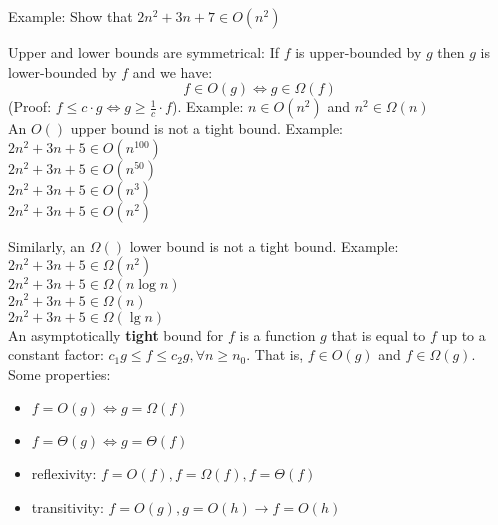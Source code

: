 \documentclass[11pt]{article}
\begin{document}
\vspace{\baselineskip}
Example: Show that $2n^2 +3n +7 \in O(n^2)$

\vspace{\baselineskip}
 Upper and lower bounds are symmetrical: If $f$ is upper-bounded by
$g$ then $g$ is lower-bounded by $f$ and we have:
$$f \in O(g) \Leftrightarrow g \in \Omega(f)$$
(Proof: $f \le c \cdot g \Leftrightarrow g \ge \frac{1}{c} \cdot f$). Example: 
$n \in O(n^2)$ and $n^2 \in \Omega(n)$\\


An $O()$ upper bound is not a tight bound.  Example: \\ 
$2n^2 + 3n +5 \in O(n^{100})$\\ 
$2n^2 +3n +5 \in O(n^{50})$\\ 
$2n^2 + 3n +5 \in O(n^3)$ \\ 
$2n^2 + 3n +5 \in O(n^2)$ 

Similarly, an $\Omega()$ lower bound is not a tight bound. Example: \\
$2n^2 + 3n +5 \in \Omega(n^2)$\\
$2n^2 + 3n +5 \in \Omega(n \log n)$ \\ 
$2n^2 + 3n +5 \in \Omega(n)$\\ 
$2n^2 + 3n +5 \in \Omega(\lg n)$\\



An asymptotically {\bf tight} bound for $f$ is a function $g$ that is
 equal to $f$ up to a constant factor: $c_1 g \le f \le c_2 g, \forall
 n \ge n_0$. That is, $f \in O(g)$ and $f \in \Omega(g)$.\\


Some properties: 
\begin{itemize}
\item $f = O(g) \Leftrightarrow g = \Omega(f)$
\item $f = \Theta(g) \Leftrightarrow g = \Theta(f)$
\item reflexivity: $f = O(f), f=\Omega(f), f=\Theta(f)$
\item transitivity: $f = O(g), g=O(h) \longrightarrow f=O(h)$
\end{itemize}
\end{document}

